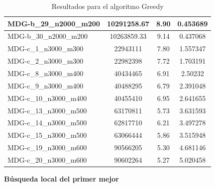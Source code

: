 \documentclass[11pt,a4paper]{article}
\begin{document}
\begin{table}[H]
\begin{center}
\begin{tabular}{|l|c|c|c|}
			MDG-b\_29\_n2000\_m200 & 10291258.67 & 8.90 & 0.453689 \\ \hline
			MDG-b\_30\_n2000\_m200 & 10263859.33 & 9.14 & 0.437068 \\ \hline
			MDG-c\_1\_n3000\_m300 & 22943111 & 7.80 & 1.557347 \\ \hline
			MDG-c\_2\_n3000\_m300 & 22982398 & 7.72 & 1.703191 \\ \hline
			MDG-c\_8\_n3000\_m400 & 40434465 & 6.91 & 2.50232 \\ \hline
			MDG-c\_9\_n3000\_m400 & 40488295 & 6.79 & 2.391048 \\ \hline
			MDG-c\_10\_n3000\_m400 & 40455410 & 6.95 & 2.641655 \\ \hline
			MDG-c\_13\_n3000\_m500 & 63170811 & 5.73 & 3.631593 \\ \hline
			MDG-c\_14\_n3000\_m500 & 62817710 & 6.21 & 3.497278 \\ \hline
			MDG-c\_15\_n3000\_m500 & 63066444 & 5.86 & 3.515948 \\ \hline
			MDG-c\_19\_n3000\_m600 & 90566205 & 5.30 & 4.681146 \\ \hline
			MDG-c\_20\_n3000\_m600 & 90602264 & 5.27 & 5.020458 \\ \hline
		\end{tabular}
	\end{center}
	\caption{Resultados para el algoritmo Greedy}
	\label{}
\end{table}
\newpage
\textbf{Búsqueda local del primer mejor}
\end{document}
